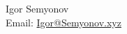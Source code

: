 


\center    
    {\huge Igor Semyonov} \\
    Email: \href{mailto:igor@semyonov.xyz}{Igor@Semyonov.xyz}

\raggedleft
